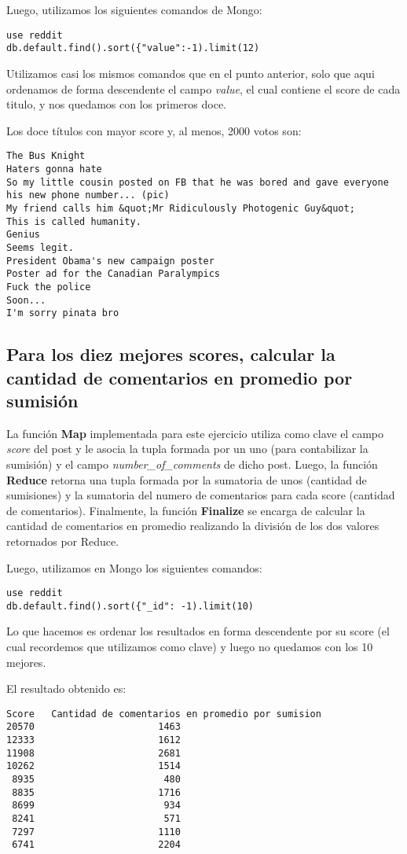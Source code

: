 Luego, utilizamos los siguientes comandos de Mongo:
\begin{lstlisting}
use reddit
db.default.find().sort({"value":-1).limit(12)
\end{lstlisting}

Utilizamos casi los mismos comandos que en el punto anterior, solo que aqui ordenamos de forma descendente el campo \textit{value}, el cual contiene el score de cada titulo, y nos quedamos con los primeros doce.

Los doce títulos con mayor score y, al menos, 2000 votos son:
\begin{lstlisting}
The Bus Knight
Haters gonna hate
So my little cousin posted on FB that he was bored and gave everyone his new phone number... (pic)
My friend calls him &quot;Mr Ridiculously Photogenic Guy&quot;
This is called humanity.
Genius
Seems legit.
President Obama's new campaign poster
Poster ad for the Canadian Paralympics
Fuck the police
Soon...
I'm sorry pinata bro
\end{lstlisting}


\subsection{Para los diez mejores scores, calcular la cantidad de comentarios en promedio por sumisión}

La función \textbf{Map} implementada para este ejercicio utiliza como clave el campo \textit{score} del post y le asocia la tupla formada por un uno (para contabilizar la sumisión) y el campo \textit{number\_of\_comments} de dicho post.
Luego, la función \textbf{Reduce} retorna una tupla formada por la sumatoria de unos (cantidad de sumisiones) y la sumatoria del numero de comentarios para cada score (cantidad de comentarios).
Finalmente, la función \textbf{Finalize} se encarga de calcular la cantidad de comentarios en promedio realizando la división de los dos valores retornados por Reduce.

Luego, utilizamos en Mongo los siguientes comandos:
\begin{lstlisting}
use reddit
db.default.find().sort({"_id": -1).limit(10)
\end{lstlisting}

Lo que hacemos es ordenar los resultados en forma descendente por su score (el cual recordemos que utilizamos como clave) y luego no quedamos con los 10 mejores.

El resultado obtenido es:
\begin{lstlisting}
Score   Cantidad de comentarios en promedio por sumision
20570                      1463 
12333                      1612
11908                      2681
10262                      1514
 8935                       480
 8835                      1716
 8699                       934
 8241                       571
 7297                      1110
 6741                      2204
\end{lstlisting}


